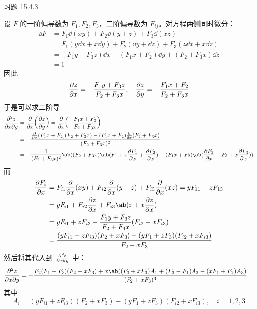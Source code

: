 \begin{problem}
    习题 15.4.3
    \begin{solution}
        设 $F$ 的一阶偏导数为 $F_1, F_2, F_3$，二阶偏导数为 $F_{ij}$。对方程两侧同时微分：
        $$
        \begin{aligned}
            \dd{F} & = F_1 \dd(x y) + F_2 \dd(y + z) + F_3 \dd(x z) \\
            & = F_1 (y \dd x + x \dd y) + F_2 (\dd y + \dd z) + F_3 (z \dd x + x \dd z) \\
            & = (F_1 y + F_3 z) \dd x + (F_1 x + F_2) \dd y + (F_2 + F_3 x) \dd z \\
            & = 0
        \end{aligned}
        $$
        因此
        $$
        \pdv{z}{x} = -\frac{F_1 y + F_3 z}{F_2 + F_3 x}, \quad \pdv{z}{y} = -\frac{F_1 x + F_2}{F_2 + F_3 x}
        $$
        于是可以求二阶导
        $$
        \begin{aligned}
            \pdv[2]{z}{x}{y} & = \pdv{x}(\pdv{z}{y}) = \pdv{x}(-\frac{F_1 x + F_2}{F_2 + F_3 x}) \\
            & = - \frac{\pdv{x}(F_1 x + F_2) (F_2 + F_3 x) - (F_1 x + F_2) \pdv{x}(F_2 + F_3 x)}{(F_2 + F_3 x)^2} \\
            & = -\frac{1}{(F_2 + F_3 x)^2} \ab((F_2 + F_3 x) \ab(F_1 + x \pdv{F_1}{x} + \pdv{F_2}{x}) - (F_1 x + F_2) \ab(\pdv{F_2}{x} + F_3 + x \pdv{F_3}{x})) \\
        \end{aligned}
        $$
        而
        $$
        \begin{aligned}
            \pdv{F_i}{x} & = F_{i1} \pdv{x}(x y) + F_{i2} \pdv{x}(y + z) + F_{i3} \pdv{x}(x z) = y F_{11} + z F_{13} \\
            & = y F_{i1} + F_{i2} \pdv{z}{x} + F_{i3} \ab(z + x \pdv{z}{x}) \\
            & = y F_{i1} + z F_{i3} - \frac{F_1 y + F_3 z}{F_2 + F_3 x} (F_{i2} - x F_{i3}) \\
            & = \frac{(y F_{i1} + z F_{i3})(F_2 + x F_3) - (y F_1 + z F_3)(F_{i2} + x F_{i3})}{F_2 + x F_3}
        \end{aligned}
        $$
        然后将其代入到 $\pdv[2]{z}{x}{y}$ 中：
        $$
        \begin{aligned}
            \pdv[2]{z}{x}{y} & = - \frac{F_2 (F_1 - F_3) (F_2 + x F_3) + x \ab((F_2 + x F_3)A_1 + (F_3 - F_1) A_2 - (x F_1 + F_2) A_3)}{(F_2 + x F_3)^3}
        \end{aligned}
        $$
        其中
        $$
        A_i = (y F_{i1} + z F_{i3})(F_2 + x F_3) - (y F_1 + z F_3)(F_{i2} + x F_{i3}),\quad i = 1, 2, 3
        $$
    \end{solution}
\end{problem}

